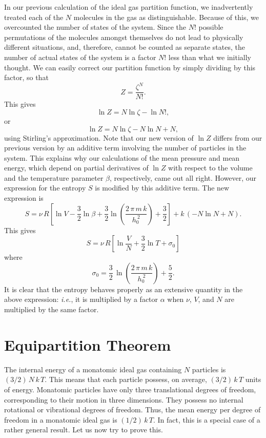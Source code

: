 In our previous calculation of the ideal gas partition function,
we inadvertently treated
each of the $N$ molecules in  the gas as distinguishable. Because of this,
 we overcounted the
number of states of the system. Since the $N!$ possible permutations of the
molecules amongst themselves do not lead to physically different situations,
and, therefore, cannot be counted as separate states, the number of actual states of
the system is a factor $N!$ less than what we initially thought. We can
easily correct  our partition function by simply dividing by this factor, so that
\begin{equation}
Z = \frac{\zeta^N}{N!}.
\end{equation}
This gives
\begin{equation}
\ln Z = N \ln \zeta - \ln N!,
\end{equation}
or
\begin{equation}
\ln Z = N \ln \zeta - N \ln N + N,
\end{equation}
using Stirling's approximation. Note that our new version of $\ln Z$
differs from our previous version by an additive term involving the number of 
particles in the system. This explains why our calculations of the mean pressure
and mean energy, which depend on partial derivatives of $\ln Z$ with respect to
the volume and the temperature parameter $\beta$, respectively,
came out all right. However,
our expression for the entropy $S$ is modified by this additive term. The new
expression is
\begin{equation}
S = \nu\, R\left[ \ln V - \frac{3}{2} \ln \beta +\frac{3}{2}
\ln\!\left(\frac{2\,\pi\, m\,k}{h_0^{~2}}\right) + \frac{3}{2}\right]+ k\,(-N\ln N + N).
\end{equation}
This gives
\begin{equation}
S = \nu \,R \left[ \ln \frac{V}{N} + \frac{3}{2} \ln T + \sigma_0\right]
\end{equation}
where
\begin{equation}
\sigma_0 = \frac{3}{2}\,\ln\!\left(\frac{2\,\pi\, m\, k}{h_0^{~2}}\right) + \frac{5}{2}.
\end{equation}
It is clear that  the entropy behaves properly as
an extensive quantity in the above
expression: {\em i.e.}, it is multiplied by a factor $\alpha$ when $\nu$, $V$,
and $N$ are multiplied by the same factor. 

\section{Equipartition Theorem}\label{s7eq}
The internal energy of a monatomic ideal gas containing $N$ particles is $(3/2)\,N
\,k\,T$.
This means that each particle possess, on average, $(3/2)\,k\,T$ units of energy. 
Mon\-atomic particles have only three translational degrees
of freedom, corresponding to
their motion in three dimensions. They possess no internal 
rotational or vibrational degrees of freedom. Thus, the mean energy per degree of
freedom in a monatomic  ideal gas is $(1/2)\,k\,T$. In fact, 
this is a special case of a rather general result. Let us now try to prove this. 

